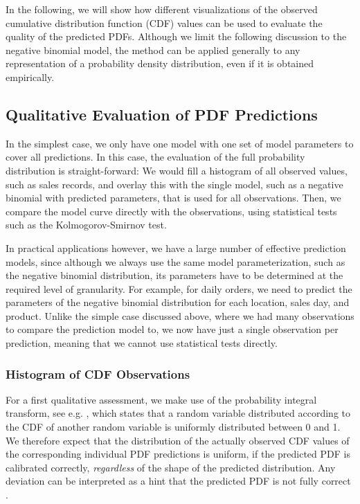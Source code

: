 \documentclass[BCOR=1mm, DIV=calc,10pt,
twoside=true,
twocolumn,
headings=normal]{scrartcl}
\begin{document}
In the following, we will show how different visualizations of the observed cumulative distribution function (CDF) values can be used to evaluate the quality of the predicted PDFs. Although we limit the following discussion to the negative binomial model, the method can be applied generally to any representation of a probability density distribution, even if it is obtained empirically.

\subsection{Qualitative Evaluation of PDF Predictions}

In the simplest case, we only have one model with one set of model parameters to cover all predictions. In this case, the evaluation of the full probability distribution is straight-forward: We would fill a histogram of all observed values, such as sales records, and overlay this with the single model, such as a negative binomial with predicted parameters, that is used for all observations. Then, we compare the model curve directly with the observations, using statistical tests such as the Kolmogorov-Smirnov test.

In practical applications however, we have a large number of effective prediction models, since although we always use the same model parameterization, such as the negative binomial distribution, its parameters have to be determined at the required level of granularity. For example, for daily orders, we need to predict the parameters of the negative binomial distribution for each location, sales day, and product. Unlike the simple case discussed above, where we had many observations to compare the prediction model to, we now have just a single observation per prediction, meaning that we cannot use statistical tests directly.

\subsubsection{Histogram of CDF Observations}
\label{sec:cdf_histo}

For a first qualitative assessment, we make use of the probability integral transform, see e.g. \cite{Angus1994,casella2002statistical}, which states that a random variable distributed according to the CDF of another random variable is uniformly distributed between 0 and 1. We therefore expect that the distribution of the actually observed CDF values of the corresponding individual PDF predictions is uniform, if the predicted PDF is calibrated correctly, {\em regardless} of the shape of the predicted distribution. Any deviation can be interpreted as a hint that the predicted PDF is not fully correct \cite{diebold1998vevaluating}.
\end{document}
